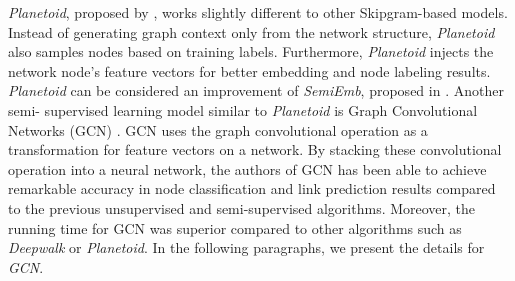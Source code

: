 \documentclass{article}
\theoremstyle{definition}
\begin{document}
\emph{Planetoid}, proposed by \citeauthor{planetoid}, works slightly different to 
other Skipgram-based models. Instead of generating graph context only from the
network structure, \emph{Planetoid} also samples nodes based on training labels. 
Furthermore, \emph{Planetoid} injects the network node's feature vectors for better 
embedding and node labeling results. \emph{Planetoid} can be considered an
improvement of \emph{SemiEmb}, proposed in \cite{weston2012deep}. Another semi-
supervised learning model similar to \emph{Planetoid} is Graph Convolutional 
Networks (GCN) \cite{gcn}. GCN uses the graph convolutional operation as a 
transformation for feature vectors on a network. By stacking these convolutional 
operation into a neural network, the authors of GCN has been able to achieve 
remarkable accuracy in node classification and link prediction results 
compared to the previous unsupervised and semi-supervised algorithms. Moreover, the
running time for GCN was superior compared to other algorithms such as 
\emph{Deepwalk} or \emph{Planetoid}. In the following paragraphs, we present 
the details for \emph{GCN}.
\end{document}
